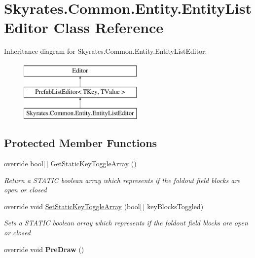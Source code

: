 \hypertarget{class_skyrates_1_1_common_1_1_entity_1_1_entity_list_editor}{\section{Skyrates.\-Common.\-Entity.\-Entity\-List\-Editor Class Reference}
\label{class_skyrates_1_1_common_1_1_entity_1_1_entity_list_editor}
}
Inheritance diagram for Skyrates.\-Common.\-Entity.\-Entity\-List\-Editor\-:\begin{figure}[H]
\begin{center}
\leavevmode
\includegraphics[height=3.000000cm]{class_skyrates_1_1_common_1_1_entity_1_1_entity_list_editor}
\end{center}
\end{figure}
\subsection*{Protected Member Functions}
\begin{DoxyCompactItemize}
\item 
override bool\mbox{[}$\,$\mbox{]} \hyperlink{class_skyrates_1_1_common_1_1_entity_1_1_entity_list_editor_a273ab9a9cab3e18450a751d3d4880f38}{Get\-Static\-Key\-Toggle\-Array} ()
\begin{DoxyCompactList}\small\item\em Return a S\-T\-A\-T\-I\-C boolean array which represents if the foldout field blocks are open or closed \end{DoxyCompactList}\item 
override void \hyperlink{class_skyrates_1_1_common_1_1_entity_1_1_entity_list_editor_a690165827351791ebe87d1f1ebc3e9e8}{Set\-Static\-Key\-Toggle\-Array} (bool\mbox{[}$\,$\mbox{]} key\-Blocks\-Toggled)
\begin{DoxyCompactList}\small\item\em Sets a S\-T\-A\-T\-I\-C boolean array which represents if the foldout field blocks are open or closed \end{DoxyCompactList}\item 
\hypertarget{class_skyrates_1_1_common_1_1_entity_1_1_entity_list_editor_a7eeb8372060fdfc338e0e6d6378bb456}{override void {\bfseries Pre\-Draw} ()}\label{class_skyrates_1_1_common_1_1_entity_1_1_entity_list_editor_a7eeb8372060fdfc338e0e6d6378bb456}

\end{DoxyCompactItemize}
